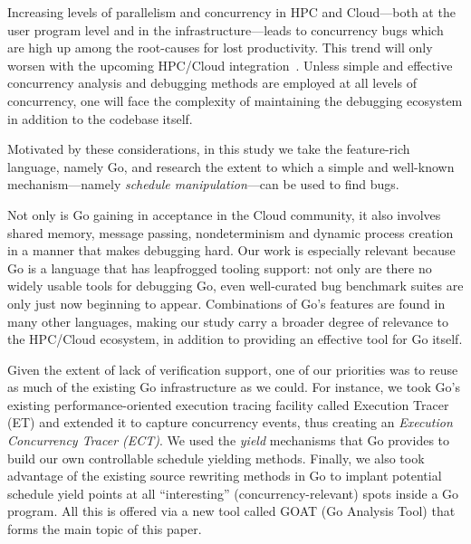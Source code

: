 
Increasing levels of parallelism and concurrency in HPC and Cloud---both
at the user program level and in the infrastructure---leads to concurrency
bugs which are high up among the root-causes for lost productivity.
%
This trend will only worsen with the upcoming HPC/Cloud
integration~\cite{dan-herbein-dong}.
%
%
Unless simple and effective concurrency analysis and
debugging methods are employed at all levels of
concurrency, one will face the complexity of maintaining
the debugging ecosystem in addition to the codebase itself.


Motivated by these considerations,
in this study we take the feature-rich language, namely Go,
and research the extent to which a simple and well-known
mechanism---namely {\em schedule manipulation}---can be used
to find bugs.


Not only is Go gaining in acceptance in the Cloud community,
it also involves shared memory, message passing, nondeterminism
and dynamic process creation in a manner that makes debugging hard.
%
Our work is especially relevant
because Go is a language that has leapfrogged tooling support: not only
are there no widely usable tools for debugging Go, even well-curated
bug benchmark suites are only just now beginning to appear.
%
%
Combinations of Go's features are found in many other languages,
making our study carry a broader degree of relevance
to the HPC/Cloud ecosystem, in addition to providing an effective
tool for Go itself.


Given the extent of lack of verification support, one of
our priorities was to reuse as much of the existing Go infrastructure
as we could.
%
For instance, we took Go's existing
performance-oriented execution tracing facility called
Execution Tracer (ET) and extended it to capture concurrency
events, thus creating an {\em Execution Concurrency Tracer (ECT)}.
%
We used the {\em yield} mechanisms that Go provides to build
our own controllable schedule yielding methods.
%
Finally, we also took advantage of the existing source rewriting
methods in Go to implant potential schedule yield points at all
``interesting'' (concurrency-relevant) spots inside a Go program.
%
All this is offered via a new tool called GOAT (Go Analysis Tool)
that forms the main topic of this paper.



